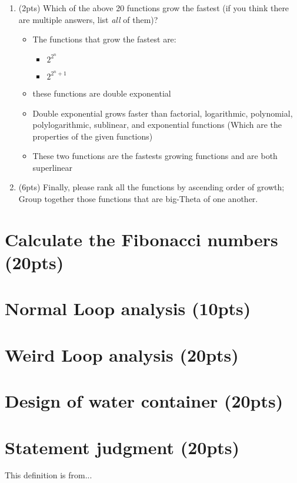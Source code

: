 \documentclass{article}[12pt]
\begin{document}
\begin{enumerate}[label=(\arabic*)]
  \item (2pts) Which of the above 20 functions grow the fastest (if you think there are multiple answers, list \emph{all} of them)?
    \begin{itemize}
      \item The functions that grow the fastest are:
        \begin{itemize}
          \item $2^{2^n}$
          \item $2^{2^n+1}$
        \end{itemize}
      \item these functions are double exponential
      \item Double exponential grows faster than factorial, logarithmic, polynomial, polylogarithmic, sublinear, and exponential functions
        (Which are the properties of the given functions)
      \item These two functions are the fastests growing functions and are both superlinear
    \end{itemize}

  \item (6pts) Finally, please rank all the functions by ascending order of growth; Group together those functions that are big-Theta of one another.

\end{enumerate}

\newpage
\section{Calculate the Fibonacci numbers (20pts)}

\newpage
\section{Normal Loop analysis (10pts)}

\newpage
\section{Weird Loop analysis (20pts)}

\newpage
\section{Design of water container (20pts)}

\newpage
\section{Statement judgment (20pts)}

\newpage
\begin{thebibliography}{99}
 This definition is from...
\end{thebibliography}
\end{document}
